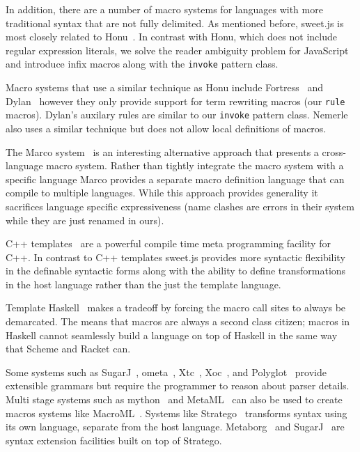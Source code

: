 \documentclass[9pt]{sigplanconf}
\begin{document}
In addition, there are a number of macro systems for languages with more traditional syntax that are not fully delimited. 
As mentioned before, sweet.js is most closely related to Honu~\cite{Rafkind2012,Rafkind2013}. In contrast with Honu, which does not include regular expression literals, we solve the reader ambiguity problem for JavaScript and introduce infix macros along with the \verb!invoke! pattern class.


Macro systems that use a similar technique as Honu include 
Fortress~\cite{Allen2009} and
Dylan~\cite{Bachrach1999} however they only provide support for term rewriting macros (our \verb!rule! macros).
Dylan's auxilary rules are similar to our \verb!invoke! pattern class.
Nemerle~\cite{Skalski2004} also uses a similar technique but does not allow local definitions of macros.

The Marco system~\cite{Lee2012a} is an interesting alternative
approach that presents a cross-language macro system. Rather than
tightly integrate the macro system with a specific language Marco
provides a separate macro definition language that can compile to
multiple languages. While this approach provides generality it
sacrifices language specific expressiveness (\eg name clashes are
errors in their system while they are just renamed in ours).

C++ templates~\cite{Alexandrescu2001} are a powerful compile time meta programming facility for C++. In contrast to C++ templates sweet.js provides more syntactic flexibility in the definable syntactic forms along with the ability to define transformations in the host language rather than the just the template language.

Template Haskell~\cite{Sheard2002} makes a tradeoff by forcing the macro call sites to always be demarcated. The means that macros are always a second class citizen; macros in Haskell cannot seamlessly build a language on top of Haskell in the same way that Scheme and Racket can.

Some systems such as 
SugarJ~\cite{Erdweg2011},
ometa~\cite{Warth2007},
Xtc~\cite{Grimm2006},
Xoc~\cite{Cox2008}, and Polyglot~\cite{Nystrom2003} provide extensible grammars but require the programmer to reason about parser details.
Multi stage systems such as mython~\cite{Riehl2009} and MetaML~\cite{Taha1997,Martel1997} can also be used to create macros systems like MacroML~\cite{Ganz2001}.
Systems like
Stratego~\cite{Visser2004} transforms syntax using its own language, separate from the host language. Metaborg~\cite{Bravenboer2004} and SugarJ~\cite{Erdweg2011} are syntax extension facilities built on top of Stratego.
\end{document}
